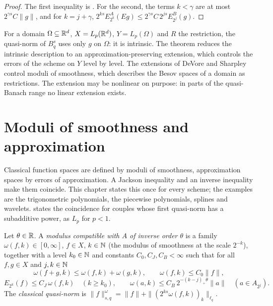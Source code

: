 \begin{proof}
\leanok
The first inequality is . For the second, the terms $k < \gamma$
are at most $2^{\gamma s} C \|g\|$, and for $k = j + \gamma$,
$2^{ks} E^A_{2^k}(E g) \leq 2^{\gamma s} C \, 2^{js} E^B_{2^j}(g)$.
\end{proof}

For a domain $\Omega \subseteq \mathbb{R}^d$, $X = L_p(\mathbb{R}^d)$, $Y = L_p(\Omega)$ and $R$ the restriction,
the quasi-norm of $B^s_q$ uses only $g$ on $\Omega$: it is intrinsic. The theorem reduces the
intrinsic description to an approximation-preserving extension, which controls the errors of
the scheme on $Y$ level by level. The extensions of DeVore and Sharpley~\cite{DeVoreSharpley}
control moduli of smoothness, which describes the Besov spaces of a domain as restrictions. The
extension may be nonlinear on purpose: in parts of the quasi-Banach range no linear extension
exists.

\chapter{Moduli of smoothness and approximation}
\label{ch:moduli-abstract}

Classical function spaces are defined by moduli of smoothness, approximation spaces by errors
of approximation. A Jackson inequality and an inverse inequality make them coincide. This
chapter states this once for every scheme; the examples are the trigonometric polynomials, the
piecewise polynomials, splines and wavelets.  states the coincidence for
couples whose first quasi-norm has a subadditive power, as $L_p$ for $p < 1$.

\begin{definition}
\label{def:modulus-data}
\leanok
{}
Let $\theta \in \mathbb{R}$. A \emph{modulus compatible with $A$ of inverse order $\theta$} is a family
$\omega(f, k) \in [0, \infty]$, $f \in X$, $k \in \mathbb{N}$ (the modulus of smoothness at the scale
$2^{-k}$), together with a level $k_0 \in \mathbb{N}$ and constants $C_0, C_J, C_B < \infty$ such that for
all $f, g \in X$ and $j, k \in \mathbb{N}$
\[
  \omega(f + g, k) \leq \omega(f, k) + \omega(g, k), \qquad \omega(f, k) \leq C_0 \|f\|,
\]
\[
  E_{2^k}(f) \leq C_J \, \omega(f, k) \quad (k \geq k_0), \qquad
  \omega(a, k) \leq C_B \, 2^{-(k - j)_+ \theta} \|a\| \quad (a \in A_{2^j}) .
\]
The \emph{classical quasi-norm} is
$\|f\|^{\omega}_{s,q} = \|f\| + \|(2^{ks} \omega(f, k))_k\|_{\ell_q}$.
\end{definition}

